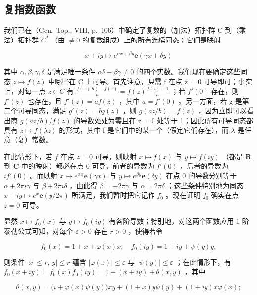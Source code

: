 \subsection{复指数函数}

我们已在（Gen.~Top., VIII, p.~106）中确定了复数的（加法）拓扑群 C 到（乘法）拓扑群 \(C^{*}\) （由 \(\neq 0\) 的复数组成）上的所有连续同态；它们是映射

\[
x + i y \mapsto e ^ {\alpha x + \beta y} \mathbf {e} (\gamma x + \delta y)\tag{20}
\]

其中 \(\alpha, \beta, \gamma, \delta\) 是满足唯一条件 \(\alpha\delta - \beta\gamma \neq 0\) 的四个实数。我们现在要确定这些同态 \(z \mapsto f(z)\) 中哪些在 C 上可导。首先注意，只需 f 在点 z = 0 可导即可；事实上，对每一点 \(z \in C\) 有 \(\frac{f(z + h) - f(z)}{h} = f(z) \frac{f(h) - 1}{h}\) ；若 \(f'(0)\) 存在，则 \(f'(z)\) 也存在，且 \(f'(z) = af(z)\) ，其中 \(a = f'(0)\) 。另一方面，若 g 是第二个可导同态，满足 \(g'(z) = bg(z)\) ，则 \(g(az/b) = f(z)\) ，因为立即可以看出商 \(g(az/b)/f(z)\) 的导数处处为零且在 z = 0 处等于 1；因此所有可导同态都具有 \(z \mapsto f(\lambda z)\) 的形式，其中 f 是它们中的某一个（假定它们存在），而 \(\lambda\) 是任意（复）常数。

在此情形下，若 \(f\) 在点 \(z = 0\) 可导，则映射 \(x \mapsto f(x)\) 与 \(y \mapsto f(iy)\) （都是 \(\mathbf{R}\) 到 \(\mathbf{C}\) 中的映射）都必在点 0 可导，前者的导数为 \(f'(0)\) ，后者的导数为 \(if'(0)\) 。而映射 \(x \mapsto e^{\alpha x}\mathbf{e}(\gamma x)\) 与 \(y \mapsto e^{\beta y}\mathbf{e}(\delta y)\) 在点 0 的导数分别等于 \(\alpha + 2\pi i\gamma\) 与 \(\beta + 2\pi i\delta\) ，由此得 \(\beta = -2\pi\gamma\) 与 \(\alpha = 2\pi\delta\) ；这些条件特别地为同态 \(x + iy \mapsto e^x\mathbf{e}(y/2\pi)\) 所满足，我们暂时把它记作 \(f_0\) 。现在证明 \(f_0\) 确实在点 \(z = 0\) 可导。

显然 \(x \mapsto f_0(x)\) 与 \(y \mapsto f_0(iy)\) 有各阶导数；特别地，对这两个函数应用 1 阶泰勒公式可知，对每个 \(\varepsilon > 0\) 存在 \(r > 0\) ，使得若令

\[
f _ {0} (x) = 1 + x + \varphi (x) x, \quad f _ {0} (i y) = 1 + i y + \psi (y) y,
\]

则条件 \(|x| \leqslant r, |y| \leqslant r\) 蕴含 \(|\varphi(x)| \leqslant \varepsilon\) 与 \(|\psi(y)| \leqslant \varepsilon\) ；在此情形下，有 \(f_0(x + iy) = f_0(x)f_0(iy) = 1 + (x + iy) + \theta(x, y)\) ，其中

\[
\theta (x, y) = \bigl (i + \varphi (x) \psi (y) \bigr) x y + (1 + x) y \psi (y) + (1 + i y) x \varphi (x);
\]

